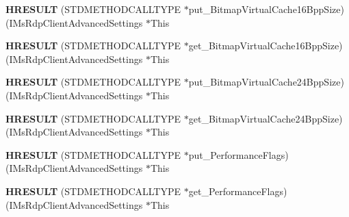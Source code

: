 \begin{DoxyCompactItemize}
\mbox{\label{struct_i_ms_rdp_client_advanced_settings_vtbl_a552ed25ecef61a8b7dc9dfcb40bd2d09}} 
{\bfseries H\+R\+E\+S\+U\+LT} (S\+T\+D\+M\+E\+T\+H\+O\+D\+C\+A\+L\+L\+T\+Y\+PE $\ast$put\+\_\+\+Bitmap\+Virtual\+Cache16\+Bpp\+Size)(I\+Ms\+Rdp\+Client\+Advanced\+Settings $\ast$This
\item 
\mbox{\label{struct_i_ms_rdp_client_advanced_settings_vtbl_af89a6a6150667c376bf028de0a6f4245}} 
{\bfseries H\+R\+E\+S\+U\+LT} (S\+T\+D\+M\+E\+T\+H\+O\+D\+C\+A\+L\+L\+T\+Y\+PE $\ast$get\+\_\+\+Bitmap\+Virtual\+Cache16\+Bpp\+Size)(I\+Ms\+Rdp\+Client\+Advanced\+Settings $\ast$This
\item 
\mbox{\label{struct_i_ms_rdp_client_advanced_settings_vtbl_a189c57a9df395151aa237519e09bb79a}} 
{\bfseries H\+R\+E\+S\+U\+LT} (S\+T\+D\+M\+E\+T\+H\+O\+D\+C\+A\+L\+L\+T\+Y\+PE $\ast$put\+\_\+\+Bitmap\+Virtual\+Cache24\+Bpp\+Size)(I\+Ms\+Rdp\+Client\+Advanced\+Settings $\ast$This
\item 
\mbox{\label{struct_i_ms_rdp_client_advanced_settings_vtbl_a1fb865c4695532877e7f2684cab57653}} 
{\bfseries H\+R\+E\+S\+U\+LT} (S\+T\+D\+M\+E\+T\+H\+O\+D\+C\+A\+L\+L\+T\+Y\+PE $\ast$get\+\_\+\+Bitmap\+Virtual\+Cache24\+Bpp\+Size)(I\+Ms\+Rdp\+Client\+Advanced\+Settings $\ast$This
\item 
\mbox{\label{struct_i_ms_rdp_client_advanced_settings_vtbl_aa298f6bbfb386d6c8b8ef7824c1a7a74}} 
{\bfseries H\+R\+E\+S\+U\+LT} (S\+T\+D\+M\+E\+T\+H\+O\+D\+C\+A\+L\+L\+T\+Y\+PE $\ast$put\+\_\+\+Performance\+Flags)(I\+Ms\+Rdp\+Client\+Advanced\+Settings $\ast$This
\item 
\mbox{\label{struct_i_ms_rdp_client_advanced_settings_vtbl_a76b8162d9272e958636bef995271eabf}} 
{\bfseries H\+R\+E\+S\+U\+LT} (S\+T\+D\+M\+E\+T\+H\+O\+D\+C\+A\+L\+L\+T\+Y\+PE $\ast$get\+\_\+\+Performance\+Flags)(I\+Ms\+Rdp\+Client\+Advanced\+Settings $\ast$This
\item 
\mbox{\label{struct_i_ms_rdp_client_advanced_settings_vtbl_a2a520fe1c9ac64abc354033b4dcb2adf}} 

\end{DoxyCompactItemize}
